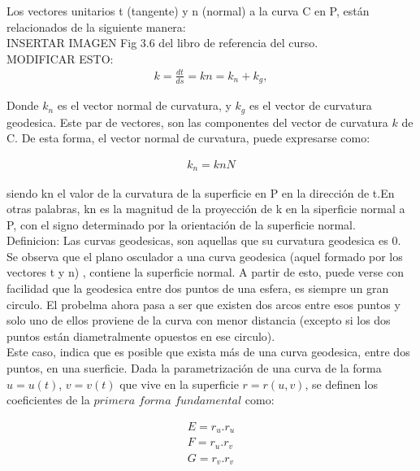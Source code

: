 \documentclass{endm}
\begin{document}
Los vectores unitarios t (tangente) y n (normal) a la curva C en P, est\'an relacionados de la siguiente manera:\\

INSERTAR IMAGEN Fig 3.6 del libro de referencia del curso.\\


MODIFICAR ESTO:
\begin{align} 
 k = \frac{dt}{ds} = k n = k_n + k_g, \label{eq1tangente}
\end{align}

Donde $k_n$ es el vector normal de curvatura, y $k_g$ es el vector de curvatura geodesica. Este par de vectores, son las componentes del vector de curvatura $k$ de C. De esta forma, el vector normal de curvatura, puede expresarse como:

\begin{align} 
 k_n = kn N \label{eq2tangente}
\end{align}

siendo kn el valor de la curvatura de la superficie en P en la direcci\'on de t.En otras palabras, kn es la magnitud de la proyecci\'on de k en la siperficie normal a P, con el signo determinado por la orientaci\'on de la superficie normal.\\

Definicion: Las curvas geodesicas, son aquellas que su curvatura geodesica es 0.\\

Se observa que el plano osculador a una curva geodesica (aquel formado por los vectores t y n) , contiene la superficie normal. A partir de esto, puede verse con facilidad que la geodesica entre dos puntos de una esfera, es siempre un gran circulo. El probelma ahora pasa a ser que existen dos arcos entre esos puntos y solo uno de ellos proviene de la curva con menor distancia (excepto si los dos puntos est\'an diametralmente opuestos en ese circulo).\\

Este caso, indica que es posible que exista m\'as de una curva geodesica, entre dos puntos, en una suerficie.
Dada la parametrizaci\'on de una curva de la forma $u=u(t)$, $v=v(t)$ que vive en la superficie $r=r(u,v)$, se definen los coeficientes de la $primera$ $forma$ $fundamental$ como:

\begin{align} 
E = r_u . r_u  \label{eqE}\\ 
F = r_u . r_v  \label{eqF} \\ 
G = r_v . r_v  \label{eqG}
\end{align}
    
\end{document}
